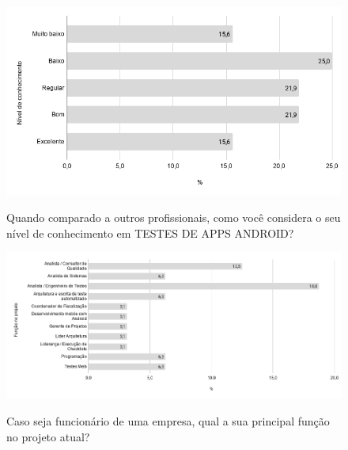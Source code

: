     
        \begin{figure}[!htb]
        \centering
        \includegraphics[width=.80\textwidth]{images/s_conhecimentotestesandroid.png}
        \label{figure:s_conhecimentotestesandroid}
        \caption{Quando comparado a outros profissionais, como você considera o seu nível de conhecimento em TESTES DE APPS ANDROID?}
        \end{figure}   
    
    
    
        \begin{figure}[!htb]
        \centering
        \includegraphics[width=.90\textwidth]{images/s_funcaoprojeto.png}
        \label{figure:s_funcaoprojeto}
        \caption{Caso seja funcionário de uma empresa, qual a sua principal função no projeto atual?}
        \end{figure}
    
